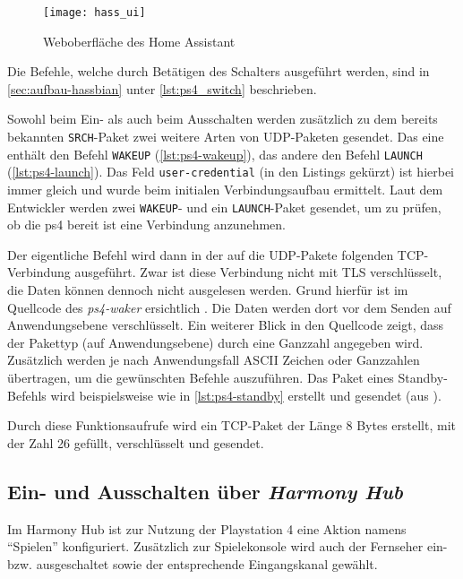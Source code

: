 \begin{figure}[h!]
    \centering
    \texttt{[image: hass\_ui]}
    \caption{Weboberfläche des Home Assistant}\label{fig:hass-ui}
\end{figure}

Die Befehle, welche durch Betätigen des Schalters ausgeführt werden,
sind in \ref{sec:aufbau-hassbian} \textit{} unter \autoref{lst:ps4_switch} beschrieben.

Sowohl beim Ein- als auch beim Ausschalten werden zusätzlich zu dem bereits bekannten \texttt{SRCH}-Paket
zwei weitere Arten von UDP-Paketen gesendet.
Das eine enthält den Befehl \texttt{WAKEUP} (\autoref{lst:ps4-wakeup}),
das andere den Befehl \texttt{LAUNCH} (\autoref{lst:ps4-launch}).
Das Feld \texttt{user-credential} (in den Listings gekürzt) ist hierbei immer gleich
und wurde beim initialen Verbindungsaufbau ermittelt.
Laut dem Entwickler werden zwei \texttt{WAKEUP}- und ein \texttt{LAUNCH}-Paket gesendet,
um zu prüfen,
ob die \ac{ps4} bereit ist eine Verbindung anzunehmen.





Der eigentliche Befehl wird dann in der auf die UDP-Pakete folgenden TCP-Verbindung ausgeführt.
Zwar ist diese Verbindung nicht mit TLS verschlüsselt,
die Daten können dennoch nicht ausgelesen werden.
Grund hierfür ist im Quellcode des \textit{ps4-waker} ersichtlich \cite{ps4waker31:online}\cite{ps4waker93:online}.
Die Daten werden dort vor dem Senden auf Anwendungsebene verschlüsselt.
Ein weiterer Blick in den Quellcode zeigt,
dass der Pakettyp (auf Anwendungsebene) durch eine Ganzzahl angegeben wird.
Zusätzlich werden je nach Anwendungsfall ASCII Zeichen oder Ganzzahlen übertragen,
um die gewünschten Befehle auszuführen.
Das Paket eines Standby-Befehls wird beispielsweise wie in \autoref{lst:ps4-standby} erstellt und gesendet (aus \cite{ps4waker31:online}).



Durch diese Funktionsaufrufe wird ein TCP-Paket der Länge 8 Bytes erstellt,
mit der Zahl 26 gefüllt,
verschlüsselt und gesendet.


\subsection{Ein- und Ausschalten über \textit{Harmony Hub}}\label{sec:durchfuehrung-harmony}
Im Harmony Hub ist zur Nutzung der Playstation 4 eine Aktion namens \enquote{Spielen} konfiguriert.
Zusätzlich zur Spielekonsole wird auch der Fernseher ein- bzw. ausgeschaltet sowie der entsprechende Eingangskanal gewählt.

